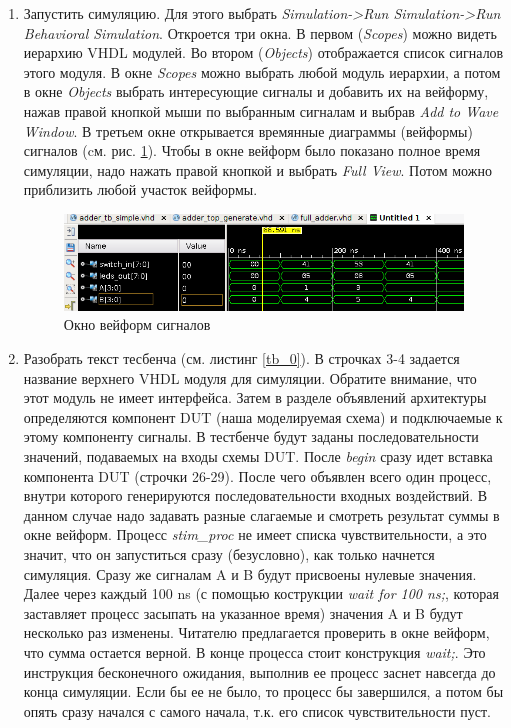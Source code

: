 \begin{enumerate}
\item Запустить симуляцию. Для этого выбрать \emph{Simulation->Run Simulation->Run  Behavioral Simulation}. Откроется три окна. В первом (\emph{Scopes}) можно видеть иерархию VHDL модулей. Во втором (\emph{Objects}) отображается список сигналов этого модуля. В окне \emph{Scopes} можно выбрать любой модуль иерархии, а потом в окне \emph{Objects} выбрать интересующие сигналы и добавить их на вейформу, нажав правой кнопкой мыши по выбранным сигналам и выбрав \emph{Add to Wave Window}. В третьем окне открывается времянные диаграммы (вейформы) сигналов (cм. рис. \ref{tb-wave}). Чтобы в окне вейформ было показано полное время симуляции, надо нажать правой кнопкой и выбрать \emph{Full View}. Потом можно приблизить любой участок вейформы.

\begin{figure}
\centering
\includegraphics[width=1.2\textwidth]{03-vhdl_modeling/fig/tb_wave.png}
\caption{Окно вейформ сигналов}
\label{tb-wave}
\end{figure}

\item Разобрать текст тесбенча (см. листинг \ref{tb_0}). В строчках 3-4 задается название верхнего VHDL модуля для симуляции. Обратите внимание, что этот модуль не имеет интерфейса. Затем в разделе объявлений архитектуры определяются компонент DUT (наша моделируемая схема) и подключаемые к этому компоненту сигналы. В тестбенче будут заданы последовательности значений, подаваемых на входы схемы DUT. После \emph{begin} сразу идет вставка компонента DUT (строчки 26-29). После чего объявлен всего один процесс, внутри которого генерируются последовательности входных воздействий. В данном случае надо задавать разные слагаемые и смотреть результат суммы в окне вейформ. 
Процесс \emph{stim\_proc} не имеет списка чувствительности, а это значит, что он запуститься сразу (безусловно), как только начнется симуляция. Сразу же сигналам A и B будут присвоены нулевые значения. Далее через каждый 100 ns (с помощью кострукции \emph{wait for 100 ns;}, которая заставляет процесс засыпать на указанное время) значения A и B будут несколько раз изменены. Читателю предлагается проверить в окне вейформ, что сумма остается верной. В конце процесса стоит конструкция \emph{wait;}. Это инструкция бесконечного ожидания, выполнив ее процесс заснет навсегда до конца симуляции. Если бы ее не было, то процесс бы завершился, а потом бы опять сразу начался с самого начала, т.к. его список чувствительности пуст. 


\end{enumerate}
